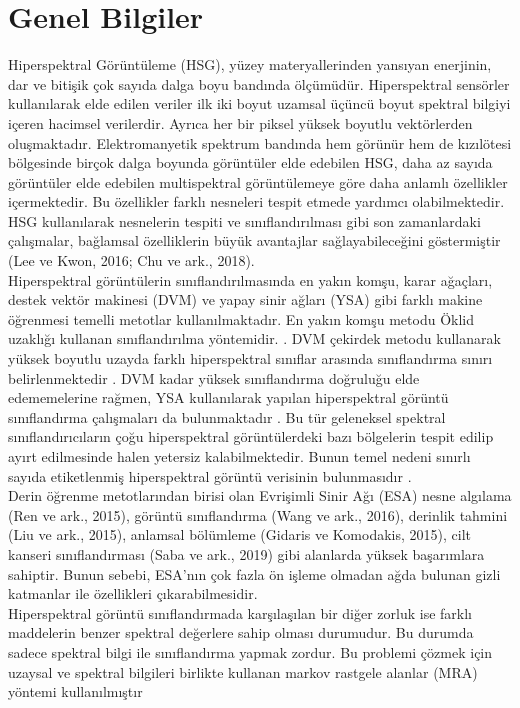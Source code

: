 \chapter{Genel Bilgiler}

Hiperspektral Görüntüleme (HSG), yüzey materyallerinden yansıyan enerjinin, dar ve bitişik çok sayıda dalga boyu bandında
ölçümüdür. Hiperspektral sensörler kullanılarak elde edilen veriler ilk iki boyut uzamsal üçüncü boyut spektral bilgiyi içeren hacimsel
verilerdir. Ayrıca her bir piksel yüksek boyutlu vektörlerden oluşmaktadır. Elektromanyetik spektrum bandında hem görünür hem de
kızılötesi bölgesinde birçok dalga boyunda görüntüler elde edebilen HSG, daha az sayıda görüntüler elde edebilen multispektral
görüntülemeye göre daha anlamlı özellikler içermektedir. Bu özellikler farklı nesneleri tespit etmede yardımcı olabilmektedir. HSG
kullanılarak nesnelerin tespiti ve sınıflandırılması gibi son zamanlardaki çalışmalar, bağlamsal özelliklerin büyük avantajlar
sağlayabileceğini göstermiştir (Lee ve Kwon, 2016; Chu ve ark., 2018).\\

Hiperspektral görüntülerin sınıflandırılmasında en yakın
komşu, karar ağaçları, destek vektör makinesi (DVM) ve
yapay sinir ağları (YSA) gibi farklı makine öğrenmesi
temelli metotlar kullanılmaktadır. En yakın komşu metodu
Öklid uzaklığı kullanan sınıflandırılma yöntemidir. \cite{blanzieri2008nearest}. DVM
çekirdek metodu kullanarak yüksek boyutlu uzayda farklı
hiperspektral sınıflar arasında sınıflandırma sınırı
belirlenmektedir \cite{melgani2004classification}. DVM kadar yüksek sınıflandırma
doğruluğu elde edememelerine rağmen, YSA kullanılarak
yapılan hiperspektral görüntü sınıflandırma çalışmaları da
bulunmaktadır \cite{ratle2010semisupervised}. Bu tür geleneksel spektral
sınıflandırıcıların çoğu hiperspektral görüntülerdeki bazı
bölgelerin tespit edilip ayırt edilmesinde halen yetersiz
kalabilmektedir. Bunun temel nedeni sınırlı sayıda
etiketlenmiş hiperspektral görüntü verisinin bulunmasıdır
\cite{kang2014intrinsic}. \\
Derin öğrenme metotlarından birisi olan Evrişimli Sinir Ağı (ESA) nesne algılama (Ren ve ark., 2015), görüntü sınıflandırma
(Wang ve ark., 2016), derinlik tahmini (Liu ve ark., 2015), anlamsal bölümleme (Gidaris ve Komodakis, 2015), cilt kanseri
sınıflandırması (Saba ve ark., 2019) gibi alanlarda yüksek başarımlara sahiptir. Bunun sebebi, ESA’nın çok fazla ön işleme olmadan
ağda bulunan gizli katmanlar ile özellikleri çıkarabilmesidir. \\
\newpage
Hiperspektral görüntü sınıflandırmada karşılaşılan bir diğer zorluk ise farklı maddelerin benzer spektral değerlere sahip
olması durumudur. Bu durumda sadece spektral bilgi ile
sınıflandırma yapmak zordur. Bu problemi çözmek için
uzaysal ve spektral bilgileri birlikte kullanan markov rastgele
alanlar (MRA) yöntemi kullanılmıştır \cite{tarabalka2010svm} \\


